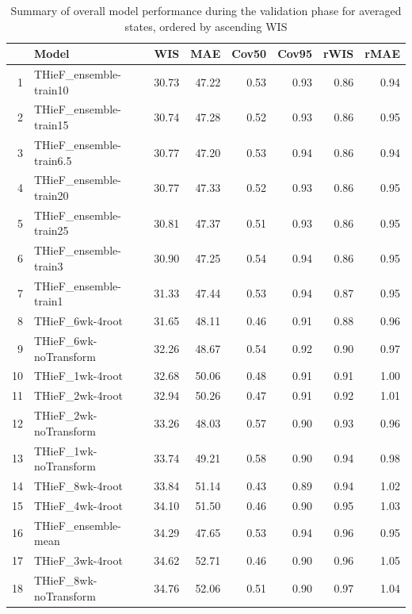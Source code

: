 \documentclass[thesis]{umassthesis}  %
\begin{document}
\begin{table}%
\begin{center}
\caption{Summary of overall model performance during the validation phase for averaged states, ordered by ascending WIS}
\label{tab:table_validation_states}
\begin{tabular}{rlrrrrrr}
  \hline
 & Model & WIS & MAE & Cov50 & Cov95 & rWIS & rMAE \\ 
  \hline
1 & THieF\_ensemble-train10 & 30.73 & 47.22 & 0.53 & 0.93 & 0.86 & 0.94 \\ 
  2 & THieF\_ensemble-train15 & 30.74 & 47.28 & 0.52 & 0.93 & 0.86 & 0.95 \\ 
  3 & THieF\_ensemble-train6.5 & 30.77 & 47.20 & 0.53 & 0.94 & 0.86 & 0.94 \\ 
  4 & THieF\_ensemble-train20 & 30.77 & 47.33 & 0.52 & 0.93 & 0.86 & 0.95 \\ 
  5 & THieF\_ensemble-train25 & 30.81 & 47.37 & 0.51 & 0.93 & 0.86 & 0.95 \\ 
  6 & THieF\_ensemble-train3 & 30.90 & 47.25 & 0.54 & 0.94 & 0.86 & 0.95 \\ 
  7 & THieF\_ensemble-train1 & 31.33 & 47.44 & 0.53 & 0.94 & 0.87 & 0.95 \\ 
  8 & THieF\_6wk-4root & 31.65 & 48.11 & 0.46 & 0.91 & 0.88 & 0.96 \\ 
  9 & THieF\_6wk-noTransform & 32.26 & 48.67 & 0.54 & 0.92 & 0.90 & 0.97 \\ 
  10 & THieF\_1wk-4root & 32.68 & 50.06 & 0.48 & 0.91 & 0.91 & 1.00 \\ 
  11 & THieF\_2wk-4root & 32.94 & 50.26 & 0.47 & 0.91 & 0.92 & 1.01 \\ 
  12 & THieF\_2wk-noTransform & 33.26 & 48.03 & 0.57 & 0.90 & 0.93 & 0.96 \\ 
  13 & THieF\_1wk-noTransform & 33.74 & 49.21 & 0.58 & 0.90 & 0.94 & 0.98 \\ 
  14 & THieF\_8wk-4root & 33.84 & 51.14 & 0.43 & 0.89 & 0.94 & 1.02 \\ 
  15 & THieF\_4wk-4root & 34.10 & 51.50 & 0.46 & 0.90 & 0.95 & 1.03 \\ 
  16 & THieF\_ensemble-mean & 34.29 & 47.65 & 0.53 & 0.94 & 0.96 & 0.95 \\ 
  17 & THieF\_3wk-4root & 34.62 & 52.71 & 0.46 & 0.90 & 0.96 & 1.05 \\ 
  18 & THieF\_8wk-noTransform & 34.76 & 52.06 & 0.51 & 0.90 & 0.97 & 1.04 \\ 

\end{tabular}
\end{center}
\end{table}
\end{document}
